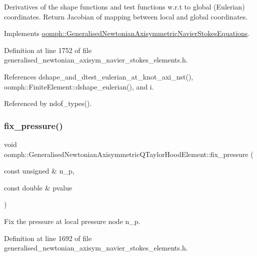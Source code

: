 Derivatives of the shape functions and test functions w.\+r.\+t to global (Eulerian) coordinates. Return Jacobian of mapping between local and global coordinates. 

Implements \hyperlink{classoomph_1_1GeneralisedNewtonianAxisymmetricNavierStokesEquations_a9321e8563cb2dfec9824024008a6914e}{oomph\+::\+Generalised\+Newtonian\+Axisymmetric\+Navier\+Stokes\+Equations}.



Definition at line 1752 of file generalised\+\_\+newtonian\+\_\+axisym\+\_\+navier\+\_\+stokes\+\_\+elements.\+h.



References dshape\+\_\+and\+\_\+dtest\+\_\+eulerian\+\_\+at\+\_\+knot\+\_\+axi\+\_\+nst(), oomph\+::\+Finite\+Element\+::dshape\+\_\+eulerian(), and i.



Referenced by ndof\+\_\+types().

\mbox{\label{classoomph_1_1GeneralisedNewtonianAxisymmetricQTaylorHoodElement_ad78373deac9f03bc187be73f207f783c}} 
\subsubsection{\texorpdfstring{fix\+\_\+pressure()}{fix\_pressure()}}
{\footnotesize\ttfamily void oomph\+::\+Generalised\+Newtonian\+Axisymmetric\+Q\+Taylor\+Hood\+Element\+::fix\+\_\+pressure (\begin{DoxyParamCaption}\item[{const unsigned \&}]{n\+\_\+p,  }\item[{const double \&}]{pvalue }\end{DoxyParamCaption})\hspace{0.3cm}{\ttfamily [inline]}}



Fix the pressure at local pressure node n\+\_\+p. 



Definition at line 1692 of file generalised\+\_\+newtonian\+\_\+axisym\+\_\+navier\+\_\+stokes\+\_\+elements.\+h.



